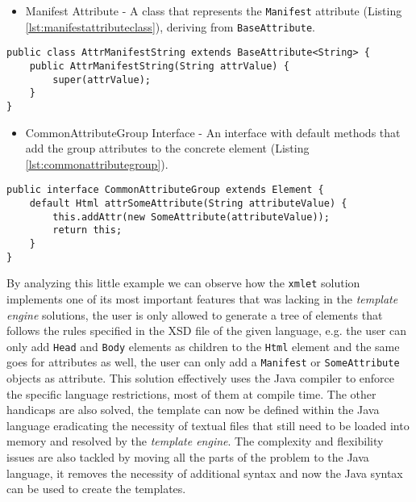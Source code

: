 \begin{itemize}
	\item Manifest Attribute - A class that represents the \texttt{Manifest} attribute  (Listing \ref{lst:manifestattributeclass}), deriving from \texttt{BaseAttribute}.
\end{itemize}

\bigskip


\begin{minipage}{\linewidth}
\begin{lstlisting}[caption={Manifest Attribute Class},captionpos=b,label={lst:manifestattributeclass}]
public class AttrManifestString extends BaseAttribute<String> {
    public AttrManifestString(String attrValue) {
        super(attrValue);
    }
}
\end{lstlisting}
\end{minipage}

\begin{itemize}
	\item CommonAttributeGroup Interface - An interface with default methods that add the group attributes to the concrete element (Listing \ref{lst:commonattributegroup}).
\end{itemize}

\bigskip


\begin{minipage}{\linewidth}
\begin{lstlisting}[caption={CommonAttributeGroup Interface},captionpos=b,label={lst:commonattributegroup}]
public interface CommonAttributeGroup extends Element {
    default Html attrSomeAttribute(String attributeValue) {
        this.addAttr(new SomeAttribute(attributeValue));
        return this;
    }
}
\end{lstlisting}
\end{minipage}

\noindent
By analyzing this little example we can observe how the \texttt{xmlet} solution implements one of its most important features that was lacking in the \textit{template engine} solutions, the user is only allowed to generate a tree of elements that follows the rules specified in the \ac{XSD} file of the given language, e.g. the user can only add \texttt{Head} and \texttt{Body} elements as children to the \texttt{Html} element and the same goes for attributes as well, the user can only add a \texttt{Manifest} or \texttt{SomeAttribute} objects as attribute. This solution effectively uses the Java compiler to enforce the specific language restrictions, most of them at compile time. The other handicaps are also solved, the template can now be defined within the Java language eradicating the necessity of textual files that still need to be loaded into memory and resolved by the \textit{template engine}. The complexity and flexibility issues are also tackled by moving all the parts of the problem to the Java language, it removes the necessity of additional syntax and now the Java syntax can be used to create the templates.

